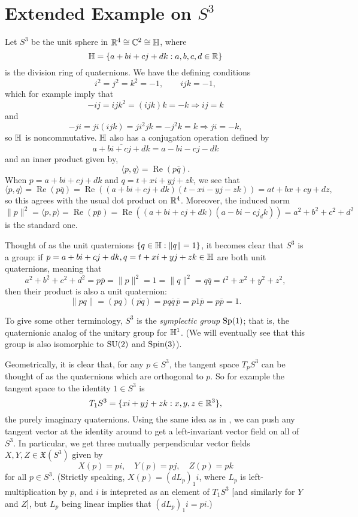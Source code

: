 
\section{Extended Example on $S^3$}
\label{sec:S^3 example}

Let $S^3$ be the unit sphere in $\mathbb{R}^4 \cong \mathbb{C}^2 \cong \mathbb{H}$, where 
\[
	\mathbb{H} = \{ a + bi + cj + dk : a,b,c,d\in \mathbb{R}\}
\]
is the division ring of quaternions. We have the defining conditions
\[
	i^2=j^2=k^2 = -1, \qquad ijk = -1,
\]
which for example imply that 
\[
	-ij = ijk^2 = (ijk)k = -k \Rightarrow ij=k
\]
and
\[
	-ji = ji(ijk) = ji^2jk = -j^2k = k \Rightarrow ji = -k,
\]
so $\mathbb{H}$ is noncommutative. $\mathbb{H}$ also has a conjugation operation defined by 
\[
	\overline{a+bi+cj+dk} = a-bi-cj-dk
\]
and an inner product given by,
\[
	\langle p,q \rangle = \operatorname{Re}(p\overline{q}).
\]
When $p = a+bi+cj+dk$ and $q = t + xi + yj + zk$, we see that
\[
	\langle p , q \rangle = \operatorname{Re}(p\overline{q}) = \operatorname{Re}((a+bi+cj+dk)(t-xi-yj-zk)) = at+bx+cy+dz,
\]
so this agrees with the usual dot product on $\mathbb{R}^4$. Moreover, the induced norm
\[
	\|p\|^2 = \langle p, p\rangle = \operatorname{Re}(p \overline{p}) = \operatorname{Re}((a+bi+cj+dk) (a-bi-cj_dk)) = a^2 + b^2 + c^2 + d^2
\]
is the standard one.

Thought of as the unit quaternions $\{q \in \mathbb{H} : \|q\| = 1\}$, it becomes clear that $S^3$ is a group: if $p = a+bi+cj+dk , q = t + xi + yj + zk \in \mathbb{H}$ are both unit quaternions, meaning that
\[
	a^2 + b^2 + c^2 + d^2 = p \overline{p} = \|p\|^2 = 1 = \|q\|^2 = q \overline{q} = t^2 + x^2 + y^2 + z^2,
\]
then their product is also a unit quaternion:
\[
	\|pq\| = (pq)(\overline{pq}) = p q \overline{q}\, \overline{p} = p 1 \overline{p} = p \overline{p} = 1.
\]

To give some other terminology, $S^3$ is the \emph{symplectic group} $\operatorname{Sp}(1)$; that is, the quaternionic analog of the unitary group for $\mathbb{H}^1$. (We will eventually see that this group is also isomorphic to $\operatorname{SU}(2)$ and $\operatorname{Spin}(3)$).

Geometrically, it is clear that, for any $p \in S^3$, the tangent space $T_pS^3$ can be thought of as the quaternions which are orthogonal to $p$. So for example the tangent space to the identity $1 \in S^3$ is
\[
	T_1 S^3 = \{xi + yj + zk : x,y,z \in \mathbb{R}^3\},
\]
the purely imaginary quaternions. Using the same idea as in , we can push any tangent vector at the identity around to get a left-invariant vector field on all of $S^3$. In particular, we get three mutually perpendicular vector fields $X,Y,Z \in \mathfrak{X}(S^3)$ given by
\[
	X(p) = pi, \quad Y(p) = pj, \quad Z(p) = pk
\]
for all $p \in S^3$. (Strictly speaking, $X(p) = (d L_p)_1 i$, where $L_p$ is left-multiplication by $p$, and $i$ is intepreted as an element of $T_1S^3$ [and similarly for $Y$ and $Z$], but $L_p$ being linear implies that $(dL_p)_1 i = pi$.)

